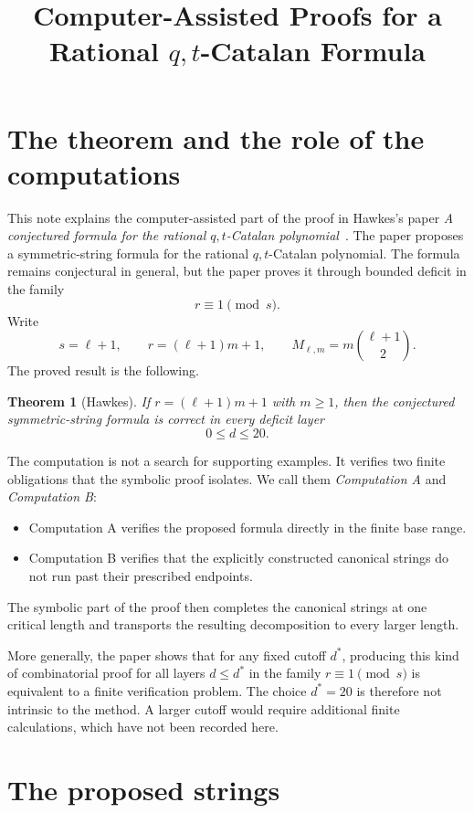 \documentclass{article}
\title{Computer-Assisted Proofs for a Rational \(q,t\)-Catalan Formula}
\author{}
\date{}
\newtheorem{theorem}{Theorem}
\begin{document}
\maketitle

\section{The theorem and the role of the computations}

This note explains the computer-assisted part of the proof in
Hawkes's paper \emph{A conjectured formula for the rational
\(q,t\)-Catalan polynomial}~\cite{Hawkes2024}.  The paper proposes a
symmetric-string formula for the rational \(q,t\)-Catalan polynomial.  The
formula remains conjectural in general, but the paper proves it through
bounded deficit in the family
\[
  r\equiv 1\pmod s.
\]
Write
\[
  s=\ell+1,
  \qquad
  r=(\ell+1)m+1,
  \qquad
  M_{\ell,m}=m\binom{\ell+1}{2}.
\]
The proved result is the following.

\begin{theorem}[Hawkes]
If \(r=(\ell+1)m+1\) with \(m\geq1\), then the conjectured
symmetric-string formula is correct in every deficit layer
\[
  0\leq d\leq20.
\]
\end{theorem}

The computation is not a search for supporting examples.  It verifies two
finite obligations that the symbolic proof isolates.  We call them
\emph{Computation A} and \emph{Computation B}:
\begin{itemize}
\item Computation A verifies the proposed formula directly in the finite base
      range.
\item Computation B verifies that the explicitly constructed canonical
      strings do not run past their prescribed endpoints.
\end{itemize}
The symbolic part of the proof then completes the canonical strings at one
critical length and transports the resulting decomposition to every larger
length.

More generally, the paper shows that for any fixed cutoff \(d^*\), producing
this kind of combinatorial proof for all layers \(d\leq d^*\) in the family
\(r\equiv1\pmod s\) is equivalent to a finite verification problem.  The
choice \(d^*=20\) is therefore not intrinsic to the method.  A larger cutoff
would require additional finite calculations, which have not been recorded
here.

\section{The proposed strings}
\end{document}
